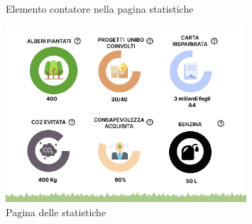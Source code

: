 \begin{figure}
    \centering
    \caption{Elemento contatore nella pagina statistiche}
    \label{fig:statItem}
\end{figure}

\begin{figure}
    \centering
    \includegraphics[width=0.8\textwidth]{img/totem/statsPage.png}
    \caption{Pagina delle statistiche}
    \label{fig:statsPageMock}
\end{figure}

